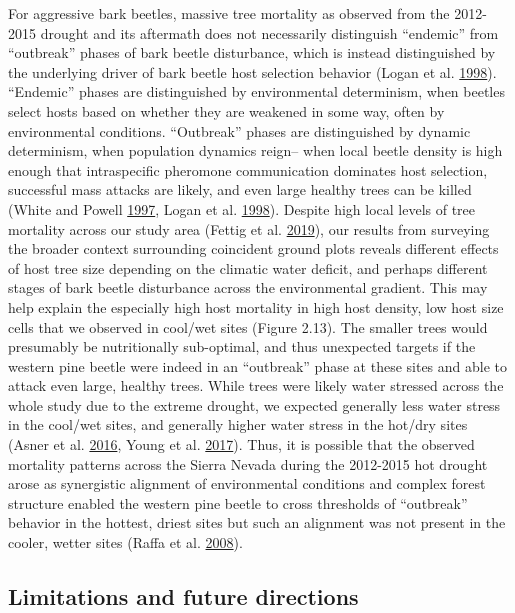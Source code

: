\documentclass[twoside,12pt,final]{ucthesis-CA2012}
\begin{document}
\begin{ucmainmatter}
For aggressive bark beetles, massive tree mortality as observed from the
2012-2015 drought and its aftermath does not necessarily distinguish
``endemic'' from ``outbreak'' phases of bark beetle disturbance, which
is instead distinguished by the underlying driver of bark beetle host
selection behavior (Logan et al.
\protect\hyperlink{ref-logan1998}{1998}). ``Endemic'' phases are
distinguished by environmental determinism, when beetles select hosts
based on whether they are weakened in some way, often by environmental
conditions. ``Outbreak'' phases are distinguished by dynamic
determinism, when population dynamics reign-- when local beetle density
is high enough that intraspecific pheromone communication dominates host
selection, successful mass attacks are likely, and even large healthy
trees can be killed (White and Powell
\protect\hyperlink{ref-white1997}{1997}, Logan et al.
\protect\hyperlink{ref-logan1998}{1998}). Despite high local levels of
tree mortality across our study area (Fettig et al.
\protect\hyperlink{ref-fettig2019}{2019}), our results from surveying
the broader context surrounding coincident ground plots reveals
different effects of host tree size depending on the climatic water
deficit, and perhaps different stages of bark beetle disturbance across
the environmental gradient. This may help explain the especially high
host mortality in high host density, low host size cells that we
observed in cool/wet sites (Figure 2.13). The smaller trees would
presumably be nutritionally sub-optimal, and thus unexpected targets if
the western pine beetle were indeed in an ``outbreak'' phase at these
sites and able to attack even large, healthy trees. While trees were
likely water stressed across the whole study due to the extreme drought,
we expected generally less water stress in the cool/wet sites, and
generally higher water stress in the hot/dry sites (Asner et al.
\protect\hyperlink{ref-asner2016}{2016}, Young et al.
\protect\hyperlink{ref-young2017}{2017}). Thus, it is possible that the
observed mortality patterns across the Sierra Nevada during the
2012-2015 hot drought arose as synergistic alignment of environmental
conditions and complex forest structure enabled the western pine beetle
to cross thresholds of ``outbreak'' behavior in the hottest, driest
sites but such an alignment was not present in the cooler, wetter sites
(Raffa et al. \protect\hyperlink{ref-raffa2008}{2008}).

\subsection{Limitations and future
directions}\label{limitations-and-future-directions}


\end{ucmainmatter}
\end{document}
